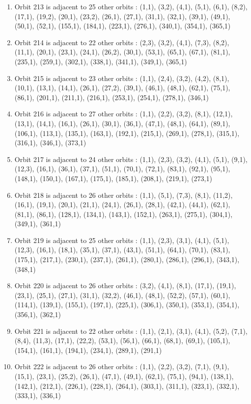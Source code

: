 \documentclass[12pt]{article}
\begin{document}
\begin{enumerate}
\item Orbit 213 is adjacent to 25 other orbits : (1,1), (3,2), (4,1), (5,1), (6,1), (8,2), (17,1), (19,2), (20,1), (23,2), (26,1), (27,1), (31,1), (32,1), (39,1), (49,1), (50,1), (52,1), (155,1), (184,1), (223,1), (276,1), (340,1), (354,1), (365,1)
\item Orbit 214 is adjacent to 22 other orbits : (2,3), (3,2), (4,1), (7,3), (8,2), (11,1), (20,1), (23,1), (24,1), (26,2), (30,1), (53,1), (65,1), (67,1), (81,1), (235,1), (259,1), (302,1), (338,1), (341,1), (349,1), (365,1)
\item Orbit 215 is adjacent to 23 other orbits : (1,1), (2,4), (3,2), (4,2), (8,1), (10,1), (13,1), (14,1), (26,1), (27,2), (39,1), (46,1), (48,1), (62,1), (75,1), (86,1), (201,1), (211,1), (216,1), (253,1), (254,1), (278,1), (346,1)
\item Orbit 216 is adjacent to 27 other orbits : (1,1), (2,2), (3,2), (8,1), (12,1), (13,1), (14,1), (16,1), (26,1), (30,1), (36,1), (47,1), (48,1), (64,1), (89,1), (106,1), (113,1), (135,1), (163,1), (192,1), (215,1), (269,1), (278,1), (315,1), (316,1), (346,1), (373,1)
\item Orbit 217 is adjacent to 24 other orbits : (1,1), (2,3), (3,2), (4,1), (5,1), (9,1), (12,3), (16,1), (36,1), (37,1), (51,1), (70,1), (72,1), (83,1), (92,1), (95,1), (148,1), (150,1), (167,1), (175,1), (185,1), (208,1), (219,1), (273,1)
\item Orbit 218 is adjacent to 26 other orbits : (1,1), (5,1), (7,3), (8,1), (11,2), (16,1), (19,1), (20,1), (21,1), (24,1), (26,1), (28,1), (42,1), (44,1), (62,1), (81,1), (86,1), (128,1), (134,1), (143,1), (152,1), (263,1), (275,1), (304,1), (349,1), (361,1)
\item Orbit 219 is adjacent to 25 other orbits : (1,1), (2,3), (3,1), (4,1), (5,1), (12,3), (16,1), (18,1), (35,1), (37,1), (43,1), (51,1), (64,1), (70,1), (83,1), (175,1), (217,1), (230,1), (237,1), (261,1), (280,1), (286,1), (296,1), (343,1), (348,1)
\item Orbit 220 is adjacent to 26 other orbits : (3,2), (4,1), (8,1), (17,1), (19,1), (23,1), (25,1), (27,1), (31,1), (32,2), (46,1), (48,1), (52,2), (57,1), (60,1), (114,1), (139,1), (155,1), (197,1), (225,1), (306,1), (350,1), (353,1), (354,1), (356,1), (362,1)
\item Orbit 221 is adjacent to 22 other orbits : (1,1), (2,1), (3,1), (4,1), (5,2), (7,1), (8,4), (11,3), (17,1), (22,2), (53,1), (56,1), (66,1), (68,1), (69,1), (105,1), (154,1), (161,1), (194,1), (234,1), (289,1), (291,1)
\item Orbit 222 is adjacent to 26 other orbits : (1,1), (2,2), (3,2), (7,1), (9,1), (15,1), (23,1), (25,2), (26,1), (47,1), (49,1), (62,1), (75,1), (94,1), (138,1), (142,1), (212,1), (226,1), (228,1), (264,1), (303,1), (311,1), (323,1), (332,1), (333,1), (336,1)

\end{enumerate}
\end{document}
